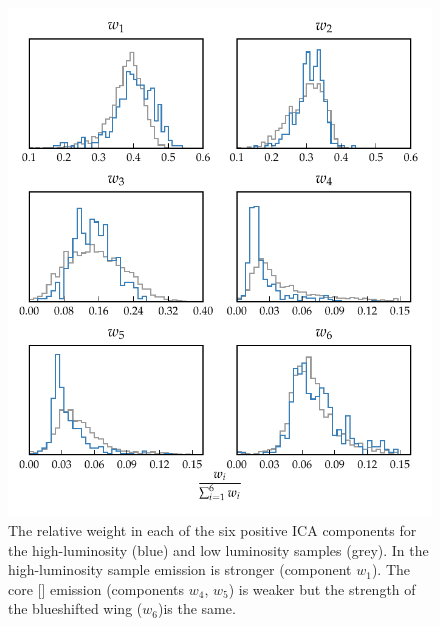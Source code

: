 \begin{figure}
    \includegraphics[width=\textwidth]{figures/chapter04/mfica_component_weights.pdf} 
    \caption{The relative weight in each of the six positive \ac{ICA} components for the high-luminosity (blue) and low luminosity samples (grey). In the high-luminosity sample  emission is stronger (component $w_1$). The core [] emission (components $w_4$, $w_5$) is weaker but the strength of the blueshifted wing ($w_6$)is the same.}     
    \label{fig:mfica_component_weights}
\end{figure}

